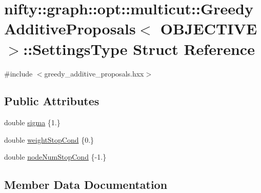 \hypertarget{structnifty_1_1graph_1_1opt_1_1multicut_1_1GreedyAdditiveProposals_1_1SettingsType}{}\section{nifty\+:\+:graph\+:\+:opt\+:\+:multicut\+:\+:Greedy\+Additive\+Proposals$<$ O\+B\+J\+E\+C\+T\+I\+VE $>$\+:\+:Settings\+Type Struct Reference}
\label{structnifty_1_1graph_1_1opt_1_1multicut_1_1GreedyAdditiveProposals_1_1SettingsType}


{\ttfamily \#include $<$greedy\+\_\+additive\+\_\+proposals.\+hxx$>$}

\subsection*{Public Attributes}
\begin{DoxyCompactItemize}
\item 
double \hyperlink{structnifty_1_1graph_1_1opt_1_1multicut_1_1GreedyAdditiveProposals_1_1SettingsType_aed073ad1c4dee39b23cf22ad4f1e62f1}{sigma} \{1.\}
\item 
double \hyperlink{structnifty_1_1graph_1_1opt_1_1multicut_1_1GreedyAdditiveProposals_1_1SettingsType_a193ddac1a5427f00736f91802ebd0435}{weight\+Stop\+Cond} \{0.\}
\item 
double \hyperlink{structnifty_1_1graph_1_1opt_1_1multicut_1_1GreedyAdditiveProposals_1_1SettingsType_ac53b868d93b29f37f1d03bc5acd5862d}{node\+Num\+Stop\+Cond} \{-\/1.\}
\end{DoxyCompactItemize}


\subsection{Member Data Documentation}
\mbox{\label{structnifty_1_1graph_1_1opt_1_1multicut_1_1GreedyAdditiveProposals_1_1SettingsType_ac53b868d93b29f37f1d03bc5acd5862d}} 

